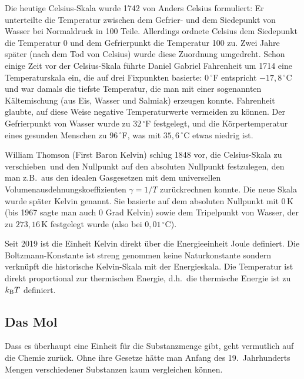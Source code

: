 Die heutige 
Celsius-Skala wurde 1742 von Anders Celsius 
formuliert: Er unterteilte die Temperatur
zwischen dem Gefrier- und dem Siedepunkt von Wasser bei Normaldruck in 100 Teile. Allerdings
ordnete Celsius dem Siedepunkt die Temperatur 0 und dem Gefrierpunkt die Temperatur
100 zu. Zwei Jahre sp\"ater (nach dem Tod von Celsius) wurde diese Zuordnung umgedreht.
Schon einige Zeit vor der Celsius-Skala f\"uhrte 
Daniel Gabriel Fahrenheit um 1714 eine Temperaturskala
ein, die auf drei Fixpunkten basierte: $0{\,}^\circ$F entspricht $-17,8{\,}^\circ$C und war damals
die tiefste Temperatur, die man mit einer sogenannten K\"altemischung (aus Eis, Wasser und Salmiak)
erzeugen konnte. Fahrenheit glaubte, auf diese Weise negative Temperaturwerte vermeiden
zu k\"onnen. Der Gefrierpunkt von Wasser wurde zu $32{\,}^\circ$F festgelegt, und die
K\"orpertemperatur eines gesunden Menschen zu $96{\,}^\circ$F, was mit $35,6{\,}^\circ$C etwas
niedrig ist. 

William Thomson (First Baron Kelvin) 
schlug 1848 vor, die Celsius-Skala \glqq zu verschieben\grqq\ und
den Nullpunkt auf den absoluten Nullpunkt festzulegen, den man z.B.\ aus den idealen Gasgesetzen
mit dem universellen Volumenausdehnungskoeffizienten $\gamma=1/T$ zur\"uckrechnen konnte. Die
neue Skala wurde sp\"ater Kelvin genannt. 
Sie basierte auf dem absoluten Nullpunkt mit $0$\,K (bis
1967 sagte man auch \glqq $0$ Grad Kelvin\grqq) sowie dem Tripelpunkt von Wasser, der zu
$273,16$\,K festgelegt wurde (also bei $0,01{\,}^\circ$C). 

Seit 2019 ist die Einheit Kelvin direkt \"uber die Energieeinheit Joule definiert.
Die Boltzmann-Konstante ist
streng genommen keine Naturkonstante sondern verkn\"upft die historische
Kelvin-Skala mit der Energieskala. Die Temperatur ist direkt proportional zur thermischen
Energie, d.h.\ die thermische Energie ist zu $k_{\rm B}T$ definiert.   

\subsection{Das Mol}

Dass es \"uberhaupt eine Einheit f\"ur die Substanzmenge gibt, geht vermutlich auf die
Chemie zur\"uck. Ohne ihre Gesetze h\"atte man Anfang des 19.\ Jahrhunderts Mengen verschiedener 
Substanzen kaum vergleichen k\"onnen.

